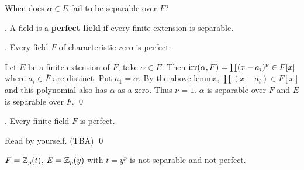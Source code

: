 When does \(\alpha \in E\) fail to be separable over \(F\)?

.  A field is a \textbf{perfect field} if every finite extension is separable.

\thm. Every field \(F\) of characteristic zero is perfect.

\pf Let \(E\) be a finite extension of \(F\), take \(\alpha \in E\). Then \(\mathrm{irr}(\alpha, F) = \prod (x - a_i)^\nu \in F[x]\) where \(a_i \in \bar{F}\) are distinct. Put \(a_1 = \alpha\). By the above lemma, \(\prod (x - a_i) \in F[x]\) and this polynomial also has \(\alpha\) as a zero. Thus \(\nu = 1\). \(\alpha\) is separable over \(F\) and \(E\) is separable over \(F\). \qed

\thm. Every finite field \(F\) is perfect.

\pf Read by yourself. (TBA) \qed

\rmk \(F = \mathbb{Z}_p(t)\), \(E = \mathbb{Z}_p(y)\) with \(t = y^p\) is not separable and not perfect.
